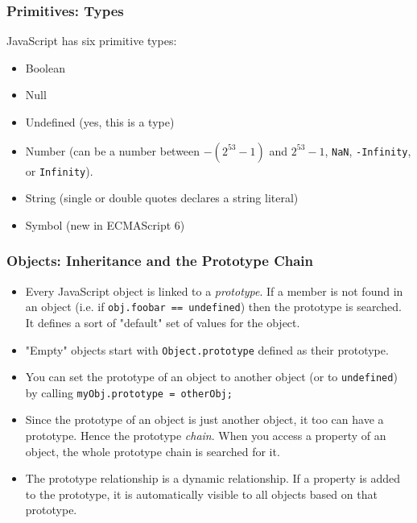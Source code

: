 \documentclass{lug}
\begin{document}
\begin{frame}
    \frametitle{Primitives: Types\footnotemark[1]}

    JavaScript has six primitive types:

    \begin{itemize}
        \item Boolean
        \item Null
        \item Undefined (yes, this is a type)
        \item Number (can be a number between $-(2^{53} - 1)$ and $2^{53} - 1$, \texttt{NaN},
            \texttt{-Infinity}, or \texttt{Infinity}).
        \item String (single or double quotes declares a string literal\footnotemark[2])
        \item Symbol (new in ECMAScript 6)
    \end{itemize}

\end{frame}

\begin{frame}
    \frametitle{Objects: Inheritance and the Prototype Chain}

    \begin{itemize}[<+->]
        \item Every JavaScript object is linked to a \textit{prototype}. If a member is not found in an object (i.e. if \texttt{obj.foobar == undefined}) then the prototype is searched. It defines a sort of "default" set of values for the object.

        \item "Empty" objects start with \texttt{Object.prototype} defined as their prototype.

        \item You can set the prototype of an object to another object (or to \texttt{undefined}) by calling
            \texttt{myObj.prototype = otherObj;}

        \item Since the prototype of an object is just another object, it too can have a prototype. Hence the prototype \textit{chain}. When you access a property of an object, the whole prototype chain is searched for it.

        \item The prototype relationship is a dynamic relationship. If a property is added to the
            prototype, it is automatically visible to all objects based on that prototype.
    \end{itemize}

\end{frame}
\end{document}
